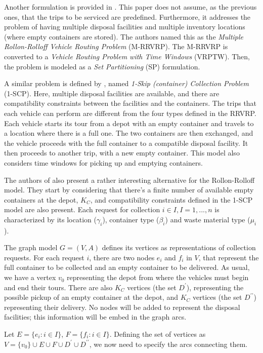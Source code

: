 Another formulation is provided in \citet{Baldacci06}. This paper does not
assume, as the previous ones, that the trips to be serviced are predefined.
Furthermore, it addresses the problem of having multiple disposal facilities
and multiple inventory locations (where empty containers are stored). The
authors named this as the \textit{Multiple Rollon-Rolloff Vehicle Routing
Problem} (M-RRVRP). The M-RRVRP is converted to a \textit{Vehicle Routing
Problem with Time Windows} (VRPTW). Then, the problem is modeled as a
\textit{Set Partitioning} (SP) formulation.

A similar problem is defined by \citet{Archetti05}, named \textit{1-Skip
(container) Collection Problem} (1-SCP). Here, multiple disposal facilities are
available, and there are compatibility constraints between the facilities and
the containers. The trips that each vehicle can perform are different from the
four types defined in the RRVRP. Each vehicle starts its tour from a depot with
an empty container and travels to a location where there is a full one. The two
containers are then exchanged, and the vehicle proceeds with the full container
to a compatible disposal facility. It then proceeds to another trip, with a new
empty container. This model also considers time windows for picking up and
emptying containers.

The authors of \citet{Aringhieri04} also present a rather interesting
alternative for the Rollon-Rolloff model. They start by considering that
there's a finite number of available empty containers at the depot, $K_C$, and
compatibility constraints defined in the 1-SCP model are also present. Each
request for collection $i \in I, I = {1, ..., n}$ is characterized by its location
($\gamma_i$), container type ($\beta_{i}$) and waste material type ($\mu_i$). 

The graph model $G = (V, A)$ defines its vertices as representations of
collection requests. For each request $i$, there are two nodes $e_i$ and $f_i$
in $V$, that represent the full container to be collected and an empty
container to be delivered. As usual, we have a vertex $v_0$ representing the
depot from where the vehicles must begin and end their tours. There are also
$K_C$ vertices (the set $D^\prime$), representing the possible pickup of an empty
container at the depot, and $K_C$ vertices (the set $D^{\prime\prime}$) representing
their delivery. No nodes will be added to represent the disposal facilities;
this information will be embed in the graph arcs.

Let $E = \{e_i : i \in I\}$, $F = \{f_i : i \in I\}$. Defining the set of
vertices as $V = \{v_0\} \cup E \cup F \cup D^\prime \cup D^{\prime\prime}$, we
now need to specify the arcs connecting them.

